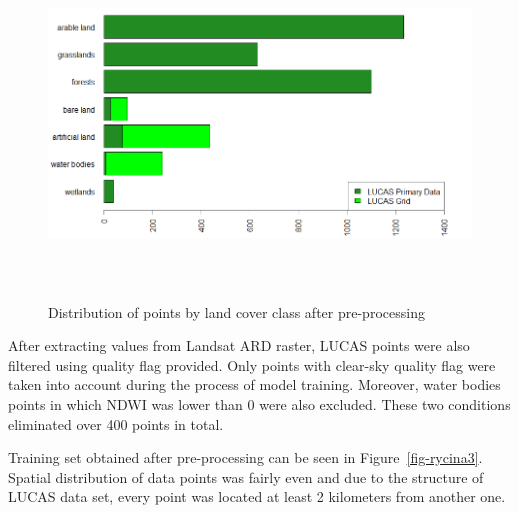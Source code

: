 \documentclass{amuthesis}
\begin{document}
\begin{figure}[t]

{\centering \includegraphics[width=1\textwidth,height=3.64583in]{./figures/lucas_data.png}

}

\caption{\label{fig-rycina2}Distribution of points by land cover class
after pre-processing}

\end{figure}

After extracting values from Landsat ARD raster, LUCAS points were also
filtered using quality flag provided. Only points with clear-sky quality
flag were taken into account during the process of model training.
Moreover, water bodies points in which NDWI was lower than 0 were also
excluded. These two conditions eliminated over 400 points in total.

Training set obtained after pre-processing can be seen in
Figure~\ref{fig-rycina3}. Spatial distribution of data points was fairly
even and due to the structure of LUCAS data set, every point was located
at least 2 kilometers from another one.
\end{document}
